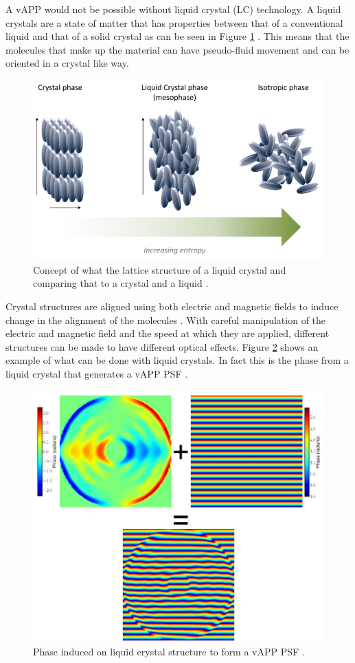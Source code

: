 A vAPP would not be possible without liquid crystal (LC) technology.  A liquid crystals are a state of matter that has properties between that of a conventional liquid and that of a solid crystal as can be seen in Figure \ref{fig:LC} \cite{DeHaan2012EngineeringNetworks}.  This means that the molecules that make up the material can have pseudo-fluid movement and can be oriented in a crystal like way. 

\begin{figure}[H]
\centering
\includegraphics[width=8 cm]{Figures/the-LC-phase.png}
\caption{Concept of what the lattice structure of a liquid crystal and comparing that to a crystal and a liquid \cite{LiquidGardens}.}
\label{fig:LC}
\end{figure}

Crystal structures are aligned using both electric and magnetic fields to induce change in the alignment of the molecules \cite{Takezoe2014HistoricalCrystals}.  With careful manipulation of the electric and magnetic field and the speed at which they are applied, different structures can be made to have different optical effects.  Figure \ref{fig:vAPP_phase} shows an example of what can be done with liquid crystals.  In fact this is the phase from a liquid crystal that generates a vAPP PSF \cite{Otten2014TheOutlook}. 

\begin{figure}[H]
\centering
\includegraphics[width=10 cm]{Figures/app_phase.jpg}
\caption{Phase induced on liquid crystal structure to form a vAPP PSF \cite{Otten2014TheOutlook}.}
\label{fig:vAPP_phase}
\end{figure}




